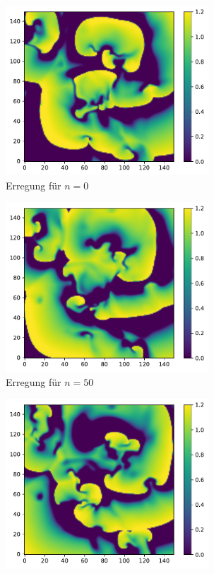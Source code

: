 \begin{appendices}
\begin{figure}[h]
	\centering
	\begin{subfigure}{.5\textwidth}
		\centering
		\includegraphics[height=2.5in]{figures/results/dynamics/bocf_0.pdf}
		\setcapmargin[1cm]{0.5cm}
		\caption{Erregung für $n=0$}
	\end{subfigure}%
	\begin{subfigure}{.5\textwidth}
		\centering
		\includegraphics[height=2.5in]{figures/results/dynamics/bocf_50.pdf}
		\setcapmargin[1cm]{0.5cm}
		\caption{Erregung für $n=50$}
	\end{subfigure}
	\begin{subfigure}{.5\textwidth}
		\centering
		\includegraphics[height=2.5in]{figures/results/dynamics/bocf_100.pdf}

\end{subfigure}
\end{figure}
\end{appendices}
